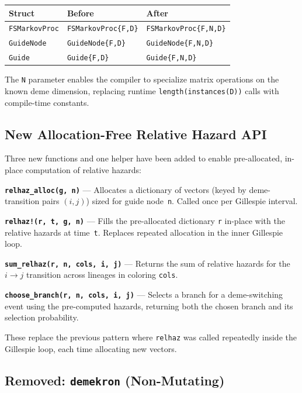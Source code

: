 \documentclass[11pt,letterpaper]{article}
\begin{document}
\begin{center}
\begin{tabular}{lll}
  \hline
  \textbf{Struct} & \textbf{Before} & \textbf{After} \\
  \hline
  \texttt{FSMarkovProc} & \texttt{FSMarkovProc\{F,D\}} & \texttt{FSMarkovProc\{F,N,D\}} \\
  \texttt{GuideNode}    & \texttt{GuideNode\{F,D\}}    & \texttt{GuideNode\{F,N,D\}} \\
  \texttt{Guide}        & \texttt{Guide\{F,D\}}        & \texttt{Guide\{F,N,D\}} \\
  \hline
\end{tabular}
\end{center}

The \texttt{N} parameter enables the compiler to specialize matrix
operations on the known deme dimension, replacing runtime
\texttt{length(instances(D))} calls with compile-time constants.

\subsection{New Allocation-Free Relative Hazard API}

Three new functions and one helper have been added to enable
pre-allocated, in-place computation of relative hazards:

\textbf{\texttt{relhaz\_alloc(g, n)}} --- Allocates a dictionary of
vectors (keyed by deme-transition pairs $(i,j)$) sized for guide
node~\texttt{n}. Called once per Gillespie interval.

\textbf{\texttt{relhaz!(r, t, g, n)}} --- Fills the pre-allocated
dictionary \texttt{r} in-place with the relative hazards at
time~\texttt{t}. Replaces repeated allocation in the inner Gillespie
loop.

\textbf{\texttt{sum\_relhaz(r, n, cols, i, j)}} --- Returns the sum of
relative hazards for the $i \to j$ transition across lineages in
coloring \texttt{cols}.

\textbf{\texttt{choose\_branch(r, n, cols, i, j)}} --- Selects a branch
for a deme-switching event using the pre-computed hazards, returning
both the chosen branch and its selection probability.

These replace the previous pattern where \texttt{relhaz} was called
repeatedly inside the Gillespie loop, each time allocating new vectors.

\subsection{Removed: \texttt{demekron} (Non-Mutating)}
\end{document}
